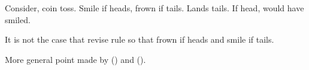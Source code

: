 \begin{note}
  Consider, coin toss.
  Smile if heads, frown if tails.
  Lands tails.
  If head, would have smiled.

  It is not the case that revise rule so that frown if heads and smile if tails.

  More general point made by (\cite{Tichy:1976tp}) and (\cite{Veltman:2005tj}).





\end{note}




